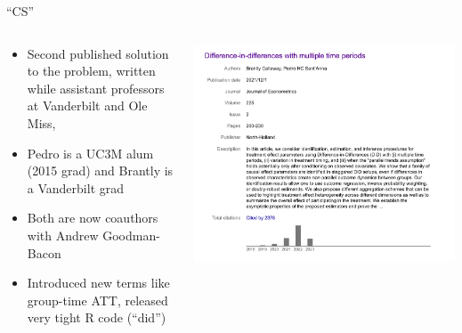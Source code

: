 \documentclass{beamer}
\begin{document}
\begin{frame}{``CS''}
  \begin{columns}
    \begin{column}{0.5\textwidth}
      \begin{itemize}
\item Second published solution to the problem, written while assistant professors at Vanderbilt and Ole Miss, 
\item Pedro is a UC3M alum (2015 grad) and Brantly is a Vanderbilt grad
\item Both are now coauthors with Andrew Goodman-Bacon
\item Introduced new terms like group-time ATT, released very tight R code (``did'')
      \end{itemize}
    \end{column}
    \begin{column}{0.5\textwidth}
      \includegraphics[scale=0.25]{./lecture_includes/pedro_cites}
    \end{column}
  \end{columns}
\end{frame}
\end{document}
